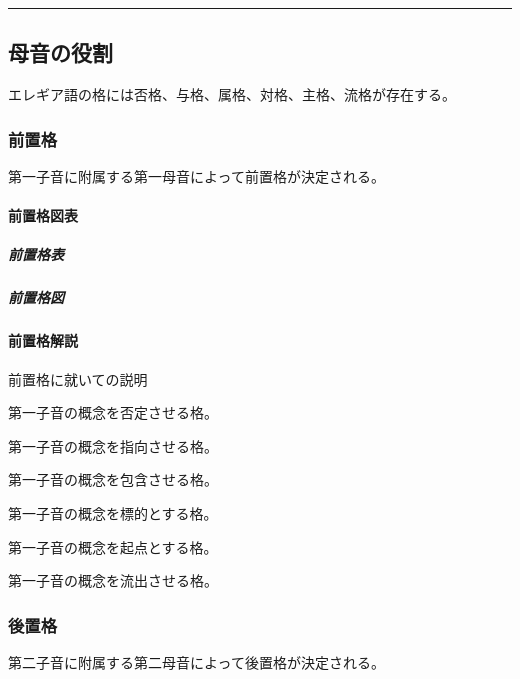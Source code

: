 \documentclass[
  japanese,
]{article}
\providecommand{\tightlist}{%
  \setlength{\itemsep}{0pt}\setlength{\parskip}{0pt}}
\begin{document}
\begin{center}\rule{0.5\linewidth}{0.5pt}\end{center}

\subsection{母音の役割}\label{chapter5}

エレギア語の格には否格、与格、属格、対格、主格、流格が存在する。

\subsubsection{前置格}\label{section5.1}

第一子音に附属する第一母音によって前置格が決定される。

\paragraph{前置格図表}\label{subsection5.1.1}

\subparagraph{前置格表}\label{subsubsection5.1.1.1}

\subparagraph{前置格図}\label{subsubsection5.1.1.2}

\paragraph{前置格解説}\label{subsection5.1.2}

前置格に就いての説明

\begin{description}
\tightlist
\item[否格]
第一子音の概念を否定させる格。
\item[与格]
第一子音の概念を指向させる格。
\item[属格]
第一子音の概念を包含させる格。
\item[対格]
第一子音の概念を標的とする格。
\item[主格]
第一子音の概念を起点とする格。
\item[流格]
第一子音の概念を流出させる格。
\end{description}

\subsubsection{後置格}\label{section5.2}

第二子音に附属する第二母音によって後置格が決定される。
\end{document}
